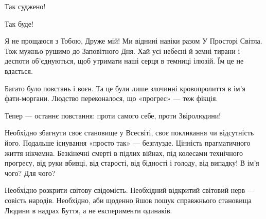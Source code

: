 Так суджено!

Так буде!

Я не прощаюся з Тобою, Друже мій! Ми віднині навіки разом У Просторі Світла.
Тож мужньо рушимо до Заповітного Дня. Хай усі небесні й земні тирани і деспоти
об’єднуються, щоб утримати наші серця в темниці ілюзій. Їм це не вдасться.

Багато було повстань і воєн. Та це були лише злочинні кровопролиття в ім’я
фати-моргани. Людство переконалося, що «прогрес» — теж фікція.

Тепер — останнє повстання: проти самого себе, проти Звіролюдини!

Необхідно збагнути своє становище у Всесвіті, своє покликання чи відсутність
його. Подальше існування «просто так» — безглузде. Цінність прагматичного життя
нікчемна. Безкінечні смерті в підлих війнах, під колесами технічного прогресу,
від руки вбивці, від старості, від бідності і голоду, від випадку! В ім’я чого?
Для чого?

Необхідно розкрити світову свідомість. Необхідний відкритий світовий нерв —
совість народів. Необхідно, аби щоденно йшов пошук справжнього становища Людини
в надрах Буття, а не експерименти одинаків.



